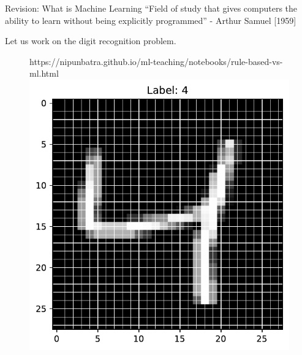 \documentclass[usenames,dvipsnames]{beamer}
\begin{document}
 
  \begin{frame}{Revision: What is Machine Learning}
	 ``Field of study that gives computers the ability to learn
		without being explicitly programmed'' - Arthur Samuel
		[1959]

		\pause Let us work on the digit recognition problem.

		\begin{figure}[htp]
			\centering
			\begin{notebookbox}{https://nipunbatra.github.io/ml-teaching/notebooks/rule-based-vs-ml.html}
			  \includegraphics[scale=0.35]{../assets/accuracy-convention/figures/mnist.pdf}
			\end{notebookbox}
		  \end{figure}
		


	\end{frame}
		
	
\end{document}
